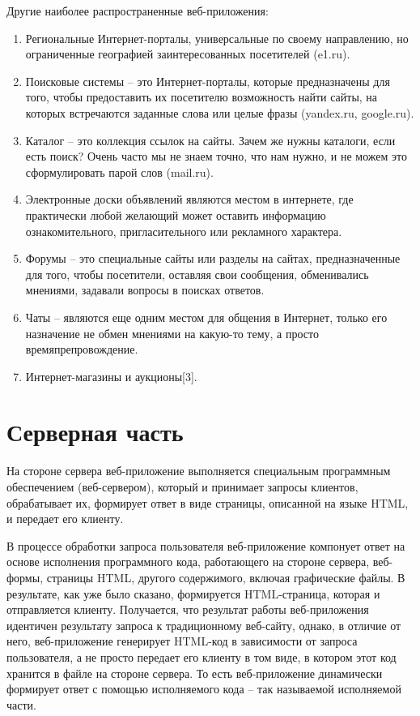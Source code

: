 Другие наиболее распространенные веб-приложения:
\begin{enumerate}
\item Региональные Интернет-порталы, универсальные по своему направлению, но ограниченные географией заинтересованных посетителей (e1.ru).
\item Поисковые системы -- это Интернет-порталы, которые предназначены для того, чтобы предоставить их посетителю возможность найти сайты, на которых встречаются заданные слова или целые фразы (yandex.ru, google.ru).
\item Каталог -- это коллекция ссылок на сайты. Зачем же нужны каталоги, если есть поиск? Очень часто мы не знаем точно, что нам нужно, и не можем это сформулировать парой слов (mail.ru).
\item Электронные доски объявлений  являются местом в интернете, где практически любой желающий может оставить информацию ознакомительного, пригласительного или рекламного характера.
\item Форумы -- это специальные сайты или разделы на сайтах, предназначенные для того, чтобы посетители, оставляя свои сообщения, обменивались мнениями, задавали вопросы в поисках ответов.
\item Чаты -- являются еще одним местом для общения в Интернет, только его назначение не обмен мнениями на какую-то тему, а просто времяпрепровождение.
\item Интернет-магазины и аукционы[3].
\end{enumerate}


\section {Серверная часть}

На стороне сервера веб-приложение выполняется специальным программным обеспечением (веб-сервером), который и принимает запросы клиентов, обрабатывает их, формирует ответ в виде страницы, описанной на языке HTML, и передает его клиенту.

В процессе обработки запроса пользователя веб-приложение компонует ответ на основе исполнения программного кода, работающего на стороне сервера, веб-формы, страницы HTML, другого содержимого, включая графические файлы. В результате, как уже было сказано, формируется HTML-страница, которая и отправляется клиенту. Получается, что результат работы веб-приложения идентичен результату запроса к традиционному веб-сайту, однако, в отличие от него, веб-приложение генерирует HTML-код в зависимости от запроса пользователя, а не просто передает его клиенту в том виде, в котором этот код хранится в файле на стороне сервера. То есть веб-приложение динамически формирует ответ с помощью исполняемого кода -- так называемой исполняемой части.

